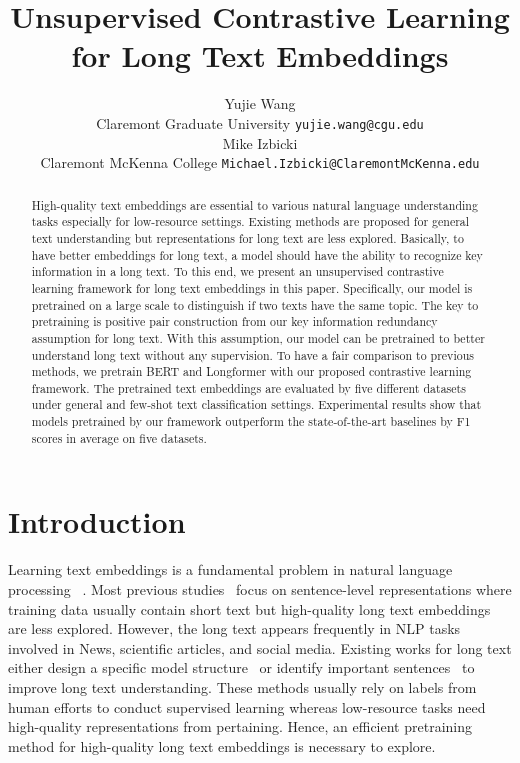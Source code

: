 \documentclass[11pt]{article}
\title{Unsupervised Contrastive Learning for Long Text Embeddings}
\author{Yujie Wang \\
  Claremont Graduate University 
  \texttt{yujie.wang@cgu.edu} \\\And
  Mike Izbicki \\
  Claremont McKenna College
  \texttt{Michael.Izbicki@ClaremontMcKenna.edu} \\}
\newcommand{\todo}[1]{{\color{red}{#1}}}
\begin{document}
\maketitle
\begin{abstract}
High-quality text embeddings are essential to various natural language understanding tasks especially for low-resource settings. 
Existing methods are proposed for general text understanding but representations for long text are less explored.
Basically, to have better embeddings for long text, a model should have the ability to recognize key information in a long text. 
To this end, we present an unsupervised contrastive learning framework for long text embeddings in this paper. 
Specifically, our model is pretrained on a large scale to distinguish if two texts have the same topic. 
The key to pretraining is positive pair construction from our key information redundancy assumption for long text. 
With this assumption, our model can be pretrained to better understand long text without any supervision.
To have a fair comparison to previous methods, we pretrain BERT and Longformer with our proposed contrastive learning framework. The pretrained text embeddings are evaluated by five different datasets under general and few-shot text classification settings.
Experimental results show that models pretrained by our framework outperform the state-of-the-art baselines by \todo{NUM} F1 scores in average on five datasets.


\end{abstract}

\section{Introduction}
Learning text embeddings is a fundamental problem in natural language processing ~\cite{Kiros2015SkipThoughtV, Hill2016LearningDR, Conneau2018SentEvalAE, Logeswaran2018AnEF, Gao2021SimCSESC, Reimers2016TaskOrientedIE}. 
Most previous studies~\cite{Hill2016LearningDR, Logeswaran2018AnEF, Gao2021SimCSESC} focus on sentence-level representations where training data usually contain short text but high-quality long text embeddings are less explored.
However, the long text appears frequently in NLP tasks involved in News, scientific articles, and social media. Existing works for long text either design a specific model structure~\cite{Pappagari2019HierarchicalTF} or identify important sentences~\cite{Ding2020CogLTXAB} to improve long text understanding. These methods usually rely on labels from human efforts to conduct supervised learning whereas low-resource tasks need high-quality representations from pertaining. Hence, an efficient pretraining method for high-quality long text embeddings is necessary to explore.
\end{document}
